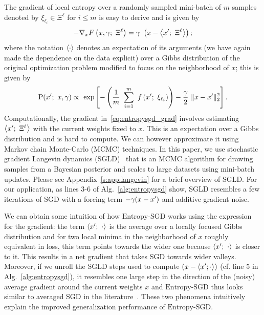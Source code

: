 \documentclass[10pt]{article}
\newcommand{\entropysgd}{\mathrm{Entropy}\textrm{-}\mathrm{SGD}}
\newcommand{\minibatch}[1]{\Xi^{#1}}
\begin{document}
The gradient of local entropy over a randomly sampled mini-batch of $m$ samples denoted by $\xi_{\ell_i} \in \minibatch{\ell}$ for $i \leq m$ is easy to derive and is given by
\begin{equation}
    -\nabla_x F\rbrac{x, \g;\ \minibatch{\ell}} = \g\ \rbrac{x - \ag{x';\ \minibatch{\ell}}};
    \label{eq:entropysgd_grad}
\end{equation}
where the notation $\left\langle\cdot\right\rangle$ denotes an expectation of its arguments (we have again made the dependence on the data explicit) over a Gibbs distribution of the original optimization problem modified to focus on the neighborhood of $x$; this is given by
\begin{equation}
    \P(x';\ x, \g) \propto\ \exp \sqbrac{-\rbrac{\f{1}{m}\ \sum_{i=1}^m\ f\rbrac{x';\ \xi_{\ell_i}}} - \f{\g}{2}\ \norm{x-x'}_2^2}.
    \label{eq:entropysgd_modified_gibbs}
\end{equation}
Computationally, the gradient in~\eqref{eq:entropysgd_grad} involves estimating $\ag{x';\ \minibatch{\ell}}$ with the current weights fixed to $x$. This is an expectation over a Gibbs distribution and is hard to compute. We can however approximate it using Markov chain Monte-Carlo (MCMC) techniques. In this paper, we use stochastic gradient Langevin dynamics (SGLD)~\citep{welling2011bayesian} that is an MCMC algorithm for drawing samples from a Bayesian posterior and scales to large datasets using mini-batch updates. Please see Appendix~\ref{s:app:langevin} for a brief overview of SGLD. For our application, as lines 3-6 of Alg.~\ref{alg:entropysgd} show, SGLD resembles a few iterations of SGD with a forcing term $-\gamma(x-x')$ and additive gradient noise.

We can obtain some intuition of how $\entropysgd$ works using the expression for the gradient: the term $\left\langle x';\ \cdot\right\rangle$ is the average over a locally focused Gibbs distribution and for two local minima in the neighborhood of $x$ roughly equivalent in loss, this term points towards the wider one because $\left\langle x';\ \cdot\right\rangle$ is closer to it. This results in a net gradient that takes SGD towards wider valleys. Moreover, if we unroll the SGLD steps used to compute $\left(x - \left\langle x'; \cdot\right\rangle\right)$ (cf. line 5 in Alg.~\ref{alg:entropysgd}), it resembles one large step in the direction of the (noisy) average gradient around the current weights $x$ and $\entropysgd$ thus looks similar to averaged SGD in the literature~\citep{polyak1992acceleration,bottou2012stochastic}. These two phenomena intuitively explain the improved generalization performance of $\entropysgd$.
\end{document}
